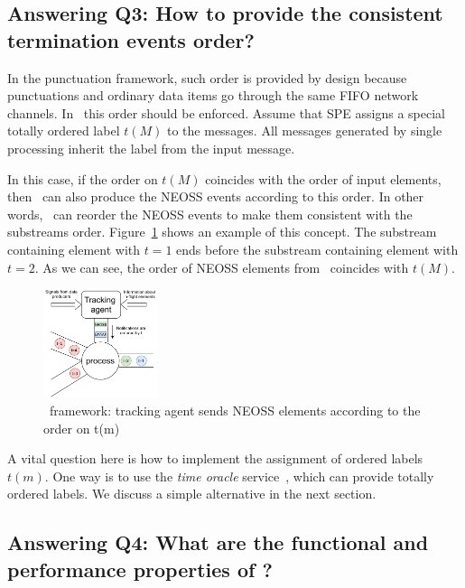 \subsection{Answering Q3: How to provide the consistent termination events order?}
\label{termination_order}
In the punctuation framework, such order is provided by design because punctuations and ordinary data items go through the same FIFO network channels. In \tracker\, this order should be enforced. Assume that SPE assigns a special totally ordered label $t(M)$ to the messages. All messages generated by single processing inherit the label from the input message. 

In this case, if the order on $t(M)$ coincides with the order of input elements, then \tracker\ can also produce the NEOSS events according to this order. In other words, \tracker\ can reorder the NEOSS events to make them consistent with the substreams order. Figure~\ref{tracker_ordering} shows an example of this concept. The substream containing element with $t=1$ ends before the substream containing element with $t=2$. As we can see, the order of NEOSS elements from \tracker\ coincides with $t(M)$.

\begin{figure}[t]
  \centering
  \includegraphics[width=0.30\textwidth]{pics/tracker-ordering.pdf}
  \caption{\tracker\ framework: tracking agent sends NEOSS elements according to the order on t(m)}
  \label{tracker_ordering}
\end{figure}

A vital question here is how to implement the assignment of ordered labels $t(m)$. One way is to use the {\em time oracle} service~\cite{10.14778/3055330.3055335}, which can provide totally ordered labels. We discuss a simple alternative in the next section. 

\subsection{Answering Q4: What are the functional and performance properties of \tracker?}
\label{tracker-properties}

